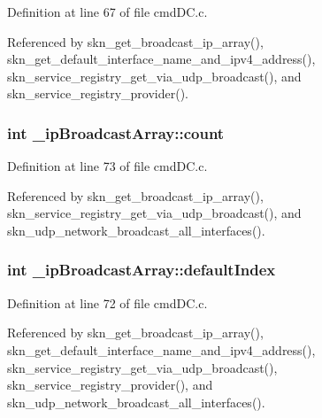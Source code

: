 Definition at line 67 of file cmd\+D\+C.\+c.



Referenced by skn\+\_\+get\+\_\+broadcast\+\_\+ip\+\_\+array(), skn\+\_\+get\+\_\+default\+\_\+interface\+\_\+name\+\_\+and\+\_\+ipv4\+\_\+address(), skn\+\_\+service\+\_\+registry\+\_\+get\+\_\+via\+\_\+udp\+\_\+broadcast(), and skn\+\_\+service\+\_\+registry\+\_\+provider().

\hypertarget{struct__ip_broadcast_array_a971377a4c995292b8bd908f185cfc844}{
\subsubsection[{count}]{\setlength{\rightskip}{0pt plus 5cm}int \+\_\+ip\+Broadcast\+Array\+::count}}\label{struct__ip_broadcast_array_a971377a4c995292b8bd908f185cfc844}


Definition at line 73 of file cmd\+D\+C.\+c.



Referenced by skn\+\_\+get\+\_\+broadcast\+\_\+ip\+\_\+array(), skn\+\_\+service\+\_\+registry\+\_\+get\+\_\+via\+\_\+udp\+\_\+broadcast(), and skn\+\_\+udp\+\_\+network\+\_\+broadcast\+\_\+all\+\_\+interfaces().

\hypertarget{struct__ip_broadcast_array_a5822ff77ae9f31bd3b4298d463c02f1f}{
\subsubsection[{default\+Index}]{\setlength{\rightskip}{0pt plus 5cm}int \+\_\+ip\+Broadcast\+Array\+::default\+Index}}\label{struct__ip_broadcast_array_a5822ff77ae9f31bd3b4298d463c02f1f}


Definition at line 72 of file cmd\+D\+C.\+c.



Referenced by skn\+\_\+get\+\_\+broadcast\+\_\+ip\+\_\+array(), skn\+\_\+get\+\_\+default\+\_\+interface\+\_\+name\+\_\+and\+\_\+ipv4\+\_\+address(), skn\+\_\+service\+\_\+registry\+\_\+get\+\_\+via\+\_\+udp\+\_\+broadcast(), skn\+\_\+service\+\_\+registry\+\_\+provider(), and skn\+\_\+udp\+\_\+network\+\_\+broadcast\+\_\+all\+\_\+interfaces().

